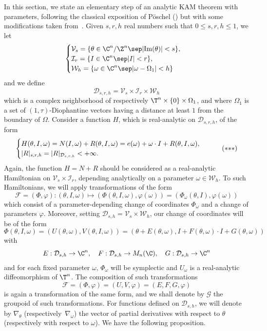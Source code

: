 In this section, we state an elementary step of an analytic KAM theorem with parameters, following the classical exposition of Pöschel (\cite{Pos01}) but with some modifications taken from~\cite{Rus01}. Given $s,r,h$ real numbers such that $0 \leq s,r,h \leq 1$, we let
\[
\begin{cases}
\mathcal{V}_s= \{ \theta \in \C^n / \Z^n \sep |\mathrm{Im}(\theta)|<s \}, \\
\mathcal{I}_{r}=\{ I \in \C^n \sep |I|<r \}, \\
\mathcal{W}_h=\{ \omega \in \C^n \sep |\omega-\Omega_1|<h \}
\end{cases}
\]
and we define
\[ \mathcal{D}_{s,r,h}=\mathcal{V}_s\times \mathcal{I}_r \times \mathcal{W}_h \]
which is a complex neighborhood of respectively $\T^n \times \{0\} \times \Omega_1$, and where $\Omega_1$ is a set of $(1,\tau)$-Diophantine vectors having a distance at least $1$ from the boundary of $\Omega$. Consider a function $H$, which is real-analytic on $\mathcal{D}_{s,r,h}$, of the form
\begin{equation}\label{Ham3}
\begin{cases}
H(\theta,I,\omega)=N(I,\omega)+R(\theta,I,\omega)=e(\omega)+\omega \cdot I+R(\theta,I,\omega), \\
|R|_{s,r,h}=|R|_{\mathcal{D}_{s,r,h}} <+\infty.
\end{cases}
\tag{${*}{*}{*}$}
\end{equation}
Again, the function $H=N+R$ should be considered as a real-analytic Hamiltonian on $\mathcal{V}_s \times \mathcal{I}_r$, depending analytically on a parameter $\omega \in \mathcal{W}_h$. To such Hamiltonians, we will apply transformations of the form
\[ \mathcal{F}=(\Phi,\varphi): (\theta,I,\omega) \mapsto (\Phi(\theta,I,\omega),\varphi(\omega))=(\Phi_\omega(\theta,I),\varphi(\omega)) \]
which consist of a parameter-depending change of coordinates $\Phi_\omega$ and a change of parameters $\varphi$. Moreover, setting $\mathcal{D}_{s,h}=\mathcal{V}_s \times \mathcal{W}_h$, our change of coordinates will be of
the form
\[\Phi(\theta,I,\omega)=(U(\theta,\omega),V(\theta,I,\omega))=(\theta+E(\theta,\omega),I+F(\theta,\omega)\cdot
I+G(\theta,\omega)) \] with
\[ E : \mathcal{D}_{s,h} \to \C^n, \quad F : \mathcal{D}_{s,h}
\to M_n(\C), \quad G : \mathcal{D}_{s,h} \to \C^n \]
and for each fixed parameter $\omega$, $\Phi_\omega$ will be
symplectic and $U_\omega$ is a real-analytic diffeomorphism of $\T^n$. The composition of such transformations
\[ \mathcal{F}=(\Phi,\varphi)=(U,V,\varphi)=(E,F,G,\varphi) \]
is again a transformation of the same form, and we shall denote by $\mathcal{G}$ the groupoid of such transformations. For functions defined on $\mathcal{D}_{s,h}$, we will denote by $\nabla_\theta$ (respectively~$\nabla_\omega$) the vector of partial derivatives with respect to $\theta$ (respectively with respect to $\omega$). We have the following proposition.

